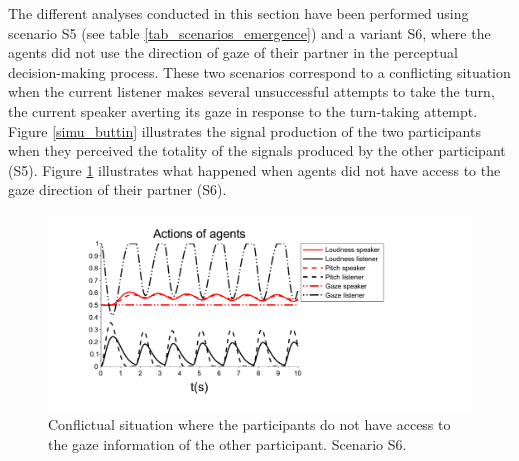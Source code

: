 
The different analyses conducted in this section have been performed using scenario S5 (see table \ref{tab_scenarios_emergence}) and a variant S6, where the agents did not use the direction of gaze of their partner in the perceptual decision-making process. 
These two scenarios correspond to a conflicting situation when the current listener makes several unsuccessful attempts to take the turn, the current speaker averting its gaze in response to the turn-taking attempt. Figure \ref{simu_buttin} illustrates the signal production of the two participants when they perceived the totality of the signals produced by the other participant (S5). Figure \ref{adapt_nogaze} illustrates what happened when agents did not have access to the gaze direction of their partner (S6).



\begin{figure}
  \centering
  \includegraphics[width=\linewidth]{figure/adapt_nogaze.pdf}
  \caption{Conflictual situation where the participants do not have access to the gaze information of the other participant. Scenario S6.}
  \label{adapt_nogaze}
\end{figure}

